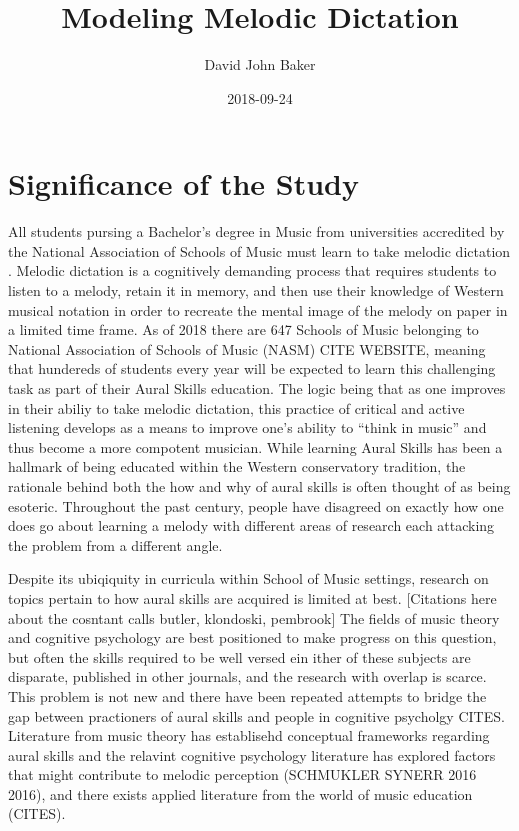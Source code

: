 \documentclass[]{book}
\title{Modeling Melodic Dictation}
\author{David John Baker}
\date{2018-09-24}
\theoremstyle{definition}
\theoremstyle{definition}
\theoremstyle{definition}
\theoremstyle{remark}
\begin{document}
\maketitle

{
\setcounter{tocdepth}{1}
\tableofcontents
}
\hypertarget{significance-of-the-study}{%
\chapter{Significance of the Study}\label{significance-of-the-study}}

All students pursing a Bachelor's degree in Music from universities
accredited by the National Association of Schools of Music must learn to
take melodic dictation \citep[ Section
VIII.6.B.2.A]{NationalAssociationSchools2018}. Melodic dictation is a
cognitively demanding process that requires students to listen to a
melody, retain it in memory, and then use their knowledge of Western
musical notation in order to recreate the mental image of the melody on
paper in a limited time frame. As of 2018 there are 647 Schools of Music
belonging to National Association of Schools of Music (NASM) CITE
WEBSITE, meaning that hundereds of students every year will be expected
to learn this challenging task as part of their Aural Skills education.
The logic being that as one improves in their abiliy to take melodic
dictation, this practice of critical and active listening develops as a
means to improve one's ability to ``think in music'' and thus become a
more compotent musician. While learning Aural Skills has been a hallmark
of being educated within the Western conservatory tradition, the
rationale behind both the how and why of aural skills is often thought
of as being esoteric. Throughout the past century, people have disagreed
on exactly how one does go about learning a melody with different areas
of research each attacking the problem from a different angle.

Despite its ubiqiquity in curricula within School of Music settings,
research on topics pertain to how aural skills are acquired is limited
at best. {[}Citations here about the cosntant calls butler, klondoski,
pembrook{]} The fields of music theory and cognitive psychology are best
positioned to make progress on this question, but often the skills
required to be well versed ein ither of these subjects are disparate,
published in other journals, and the research with overlap is scarce.
This problem is not new and there have been repeated attempts to bridge
the gap between practioners of aural skills and people in cognitive
psycholgy CITES. Literature from music theory has establisehd conceptual
frameworks regarding aural skills
\citet{karpinskiAuralSkillsAcquisition2000} and the relavint cognitive
psychology literature has explored factors that might contribute to
melodic perception (SCHMUKLER SYNERR 2016 2016), and there exists
applied literature from the world of music education (CITES).
\end{document}
